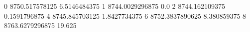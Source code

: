 0 8750.517578125 6.5146484375
1 8744.0029296875 0.0
2 8744.162109375 0.1591796875
4 8745.845703125 1.8427734375
6 8752.3837890625 8.380859375
8 8763.6279296875 19.625
